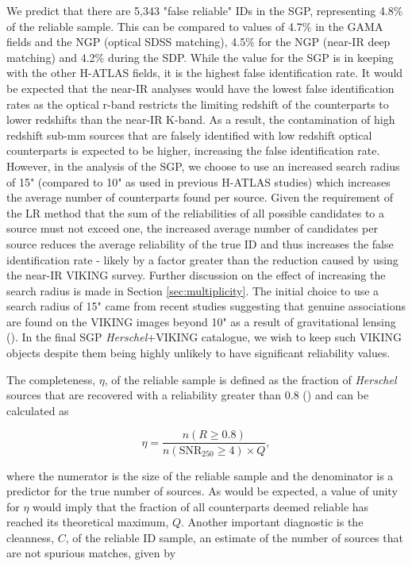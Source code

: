 We predict that there are 5,343 "false reliable" IDs in the SGP, representing 4.8\% of the reliable sample. This can be compared to values of 4.7\% in the GAMA fields and the NGP (optical SDSS matching), 4.5\% for the NGP (near-IR deep matching) and 4.2\% during the SDP. While the value for the SGP is in keeping with the other H-ATLAS fields, it is the highest false identification rate. It would be expected that the near-IR analyses would have the lowest false identification rates as the optical r-band restricts the limiting redshift of the counterparts to lower redshifts than the near-IR K-band. As a result, the contamination of high redshift sub-mm sources that are falsely identified with low redshift optical counterparts is expected to be higher, increasing the false identification rate. However, in the analysis of the SGP, we choose to use an increased search radius of 15" (compared to 10" as used in previous H-ATLAS studies) which increases the average number of counterparts found per source. Given the requirement of the LR method that the sum of the reliabilities of all possible candidates to a source must not exceed one, the increased average number of candidates per source reduces the average reliability of the true ID and thus increases the false identification rate - likely by a factor greater than the reduction caused by using the near-IR VIKING survey. Further discussion on the effect of increasing the search radius is made in Section \ref{sec:multiplicity}. The initial choice to use a search radius of 15" came from recent studies suggesting that genuine associations are found on the VIKING images beyond 10" as a result of gravitational lensing (\citealt{Bakx_2020}). In the final SGP \textit{Herschel}+VIKING catalogue, we wish to keep such VIKING objects despite them being highly unlikely to have significant reliability values.

The completeness, $\eta$, of the reliable sample is defined as the fraction of \textit{Herschel} sources that are recovered with a reliability greater than 0.8 (\citealt{Smith_2011}) and can be calculated as

\begin{equation}
    \eta = \frac{n(R \geq 0.8)}{n(\textrm{SNR}_{250} \geq 4) \times Q},
\label{eq:completeness}
\end{equation}

where the numerator is the size of the reliable sample and the denominator is a predictor for the true number of sources. As would be expected, a value of unity for $\eta$ would imply that the fraction of all counterparts deemed reliable has reached its theoretical maximum, $Q$. Another important diagnostic is the cleanness, $C$, of the reliable ID sample, an estimate of the number of sources that are not spurious matches, given by

